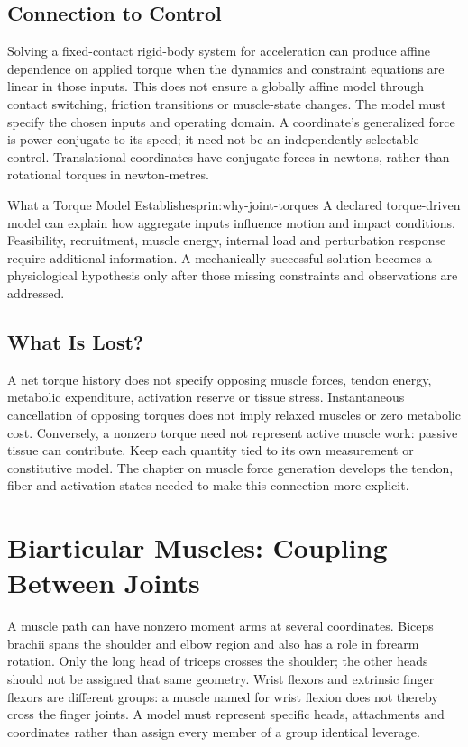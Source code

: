 \subsection{Connection to Control}

Solving a fixed-contact rigid-body system for acceleration can produce affine dependence on applied torque when the dynamics and constraint equations are linear in those inputs. This does not ensure a globally affine model through contact switching, friction transitions or muscle-state changes. The model must specify the chosen inputs and operating domain. A coordinate's generalized force is power-conjugate to its speed; it need not be an independently selectable control. Translational coordinates have conjugate forces in newtons, rather than rotational torques in newton-metres.

\begin{principle}{What a Torque Model Establishes}{prin:why-joint-torques}
A declared torque-driven model can explain how aggregate inputs influence motion and impact conditions. Feasibility, recruitment, muscle energy, internal load and perturbation response require additional information. A mechanically successful solution becomes a physiological hypothesis only after those missing constraints and observations are addressed.
\end{principle}

\subsection{What Is Lost?}

A net torque history does not specify opposing muscle forces, tendon energy, metabolic expenditure, activation reserve or tissue stress. Instantaneous cancellation of opposing torques does not imply relaxed muscles or zero metabolic cost. Conversely, a nonzero torque need not represent active muscle work: passive tissue can contribute. Keep each quantity tied to its own measurement or constitutive model. The chapter on muscle force generation develops the tendon, fiber and activation states needed to make this connection more explicit.

\section{Biarticular Muscles: Coupling Between Joints}
\label{sec:biarticular}

A muscle path can have nonzero moment arms at several coordinates. Biceps brachii spans the shoulder and elbow region and also has a role in forearm rotation. Only the long head of triceps crosses the shoulder; the other heads should not be assigned that same geometry. Wrist flexors and extrinsic finger flexors are different groups: a muscle named for wrist flexion does not thereby cross the finger joints. A model must represent specific heads, attachments and coordinates rather than assign every member of a group identical leverage.

